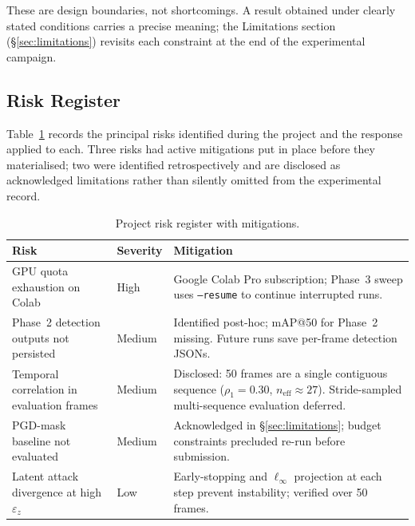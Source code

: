 \documentclass[12pt,a4paper]{report}
\begin{document}
These are design boundaries, not shortcomings. A result obtained
under clearly stated conditions carries a precise meaning; the
Limitations section (\S\ref{sec:limitations}) revisits each
constraint at the end of the experimental campaign.

\subsection{Risk Register}
\label{subsec:risks}

Table~\ref{tab:risks} records the principal risks identified
during the project and the response applied to each. Three risks
had active mitigations put in place before they materialised;
two were identified retrospectively and are disclosed as
acknowledged limitations rather than silently omitted from the
experimental record.

\begin{table}[htbp]
  \centering
  \caption{Project risk register with mitigations.}
  \label{tab:risks}
  \small
  \begin{tabular}{@{}p{4.0cm} l p{5.5cm}@{}}
    \toprule
    \textbf{Risk} & \textbf{Severity} & \textbf{Mitigation} \\
    \midrule
    GPU quota exhaustion on Colab
      & High
      & Google Colab Pro subscription; Phase~3 sweep uses
        \texttt{--resume} to continue interrupted runs. \\
    \addlinespace
    Phase~2 detection outputs not persisted
      & Medium
      & Identified post-hoc; mAP@50 for Phase~2 missing.
        Future runs save per-frame detection JSONs. \\
    \addlinespace
    Temporal correlation in evaluation frames
      & Medium
      & Disclosed: 50 frames are a single contiguous
        sequence ($\rho_1{=}0.30$,
        $n_{\text{eff}}{\approx}27$). Stride-sampled
        multi-sequence evaluation deferred. \\
    \addlinespace
    PGD-mask baseline not evaluated
      & Medium
      & Acknowledged in \S\ref{sec:limitations}; budget
        constraints precluded re-run before submission. \\
    \addlinespace
    Latent attack divergence at high $\varepsilon_z$
      & Low
      & Early-stopping and $\ell_\infty$ projection at
        each step prevent instability; verified over
        50 frames. \\
    \bottomrule
  \end{tabular}
\end{table}
\end{document}
